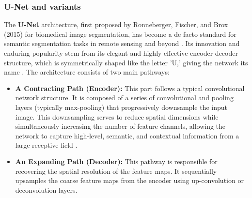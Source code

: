 \documentclass{report}
\begin{document}
\subsubsection*{U-Net and variants}
The \textbf{U-Net} architecture, first proposed by Ronneberger, Fischer, and Brox (2015) for biomedical image segmentation, has become a de facto standard for semantic segmentation tasks in remote sensing and beyond \parencites[]{RonnebergerEtAlUNetConvolutionalNetworksBiomedicalImageSegmentation2015}[p.~3f.;] {YuanEtAlreviewdeeplearningmethodssemanticsegmentationremotesensingimagery2021} [p.~173, 178]{LuoEtAlSemanticsegmentationagriculturalimagessurvey2024}. Its innovation and enduring popularity stem from its elegant and highly effective encoder-decoder structure, which is symmetrically shaped like the letter 'U,' giving the network its name \parencites[p.~6;]{NeupaneEtAlDeepLearningBasedSemanticSegmentationUrbanFeaturesSatelliteImagesReviewMetaAnalysis2021}[p.~312]{KotaridisLazaridouRemotesensingimagesegmentationadvancesmetaanalysis2021a}.
The architecture consists of two main pathways:
\begin{itemize}
    \item \textbf{A Contracting Path (Encoder):} This part follows a typical convolutional network structure. It is composed of a series of convolutional and pooling layers (typically max-pooling) that progressively downsample the input image. This downsampling serves to reduce spatial dimensions while simultaneously increasing the number of feature channels, allowing the network to capture high-level, semantic, and contextual information from a large receptive field \parencites[p.~4;]{YuanEtAlreviewdeeplearningmethodssemanticsegmentationremotesensingimagery2021}[p.~312f.]{KotaridisLazaridouRemotesensingimagesegmentationadvancesmetaanalysis2021a}.
\item \textbf{An Expanding Path (Decoder):} This pathway is responsible for recovering the spatial resolution of the feature maps. It sequentially upsamples the coarse feature maps from the encoder using up-convolution or deconvolution layers. \par
\end{itemize}
\end{document}
